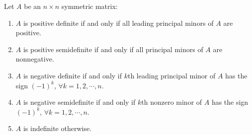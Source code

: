 \documentclass[11pt]{article}
\numberwithin{equation}{section}
\begin{document}
\begin{proposition}
    Let $A$ be an $n \times n$ symmetric matrix:\begin{enumerate}
        \item $A$ is positive definite if and only if all leading principal minors of $A$ are positive.
        \item $A$ is positive semidefinite if and only if all principal minors of $A$ are nonnegative.
        \item $A$ is negative definite if and only if $k$th leading principal minor of $A$ has the sign $(-1)^{k}$, $\forall k=1,2,\cdots,n$.
        \item $A$ is negative semidefinite if and only if $k$th nonzero minor of $A$ has the sign $(-1)^{k}$, $\forall k=1,2,\cdots,n$.
        \item $A$ is indefinite otherwise.
    \end{enumerate}
\end{proposition}
\end{document}
